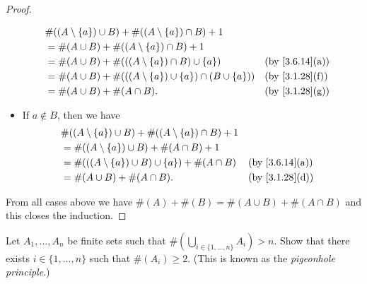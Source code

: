 \begin{proof}
\begin{itemize}
\begin{align*}
             & \#((A \setminus \{a\}) \cup B) + \#((A \setminus \{a\}) \cap B) + 1                                         \\
             & = \#(A \cup B) + \#((A \setminus \{a\}) \cap B) + 1                                                         \\
             & = \#(A \cup B) + \#(((A \setminus \{a\}) \cap B) \cup \{a\})              &  & \text{(by \cref{3.6.14}(a))} \\
             & = \#(A \cup B) + \#(((A \setminus \{a\}) \cup \{a\}) \cap (B \cup \{a\})) &  & \text{(by \cref{3.1.28}(f))} \\
             & = \#(A \cup B) + \#(A \cap B).                                            &  & \text{(by \cref{3.1.28}(g))}
          \end{align*}
    \item If \(a \notin B\), then we have
          \begin{align*}
             & \#((A \setminus \{a\}) \cup B) + \#((A \setminus \{a\}) \cap B) + 1                                   \\
             & = \#((A \setminus \{a\}) \cup B) + \#(A \cap B) + 1                                                   \\
             & = \#(((A \setminus \{a\}) \cup B) \cup \{a\}) + \#(A \cap B)        &  & \text{(by \cref{3.6.14}(a))} \\
             & = \#(A \cup B) + \#(A \cap B).                                      &  & \text{(by \cref{3.1.28}(d))}
          \end{align*}
  \end{itemize}
  From all cases above we have \(\#(A) + \#(B) = \#(A \cup B) + \#(A \cap B)\) and this closes the induction.
\end{proof}

\begin{ex}\label{ex:3.6.10}
  Let \(A_1, \dots, A_n\) be finite sets such that \(\#(\bigcup_{i \in \{1, \dots, n\}} A_i) > n\).
  Show that there exists \(i \in \{1, \dots, n\}\) such that \(\#(A_i) \geq 2\).
  (This is known as the \emph{pigeonhole principle}.)
\end{ex}

